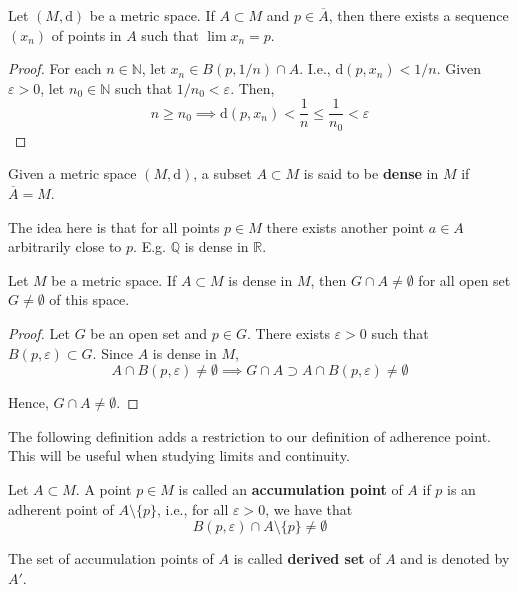 \begin{proposition}
    Let $(M, \mathrm{d})$ be a metric space. If $A \subset M$ and $p \in \overline{A}$, then there exists a sequence $(x_n)$ of points in $A$ such that $\lim x_n = p$.
\end{proposition}

\begin{proof}
    For each $n \in \mathbb{N}$, let $x_n \in B(p, 1/n) \cap A$. I.e., $\mathrm{d}(p, x_n) < 1/n$. Given $\varepsilon > 0$, let $n_0 \in \mathbb{N}$ such that $1/n_0 < \varepsilon$. Then,
    \[
        n \geq n_0 \implies \mathrm{d}(p, x_n) < \frac{1}{n} \leq \frac{1}{n_0} < \varepsilon
    \]
\end{proof}

\begin{definition}[Dense]
    Given a metric space $(M, \mathrm{d})$, a subset $A \subset M$ is said to be \textbf{dense} in $M$ if $\overline{A} = M$.
\end{definition}

The idea here is that for all points $p \in M$ there exists another point $a \in A$ arbitrarily close to $p$. E.g. $\mathbb{Q}$ is dense in $\mathbb{R}$.

\begin{proposition}
    Let $M$ be a metric space. If $A \subset M$ is dense in $M$, then $G \cap A \neq \emptyset$ for all open set $G \neq \emptyset$ of this space.
\end{proposition}

\begin{proof}
    Let $G$ be an open set and $p \in G$. There exists $\varepsilon > 0$ such that $B(p, \varepsilon) \subset G$. Since $A$ is dense in $M$,
    \[
        A \cap B(p, \varepsilon) \neq \emptyset \implies G \cap A \supset A \cap B(p, \varepsilon) \neq \emptyset
    \]

    Hence, $G \cap A \neq \emptyset$.
\end{proof}

The following definition adds a restriction to our definition of adherence point. This will be useful when studying limits and continuity.

\begin{definition}
    Let $A \subset M$. A point $p \in M$ is called an \textbf{accumulation point} of $A$ if $p$ is an adherent point of $A \setminus \{ p \}$, i.e., for all $\varepsilon > 0$, we have that
    \[
        B(p, \varepsilon) \cap A \setminus \{ p \} \neq \emptyset
    \]

    The set of accumulation points of $A$ is called \textbf{derived set} of $A$ and is denoted by $A'$.
\end{definition}

